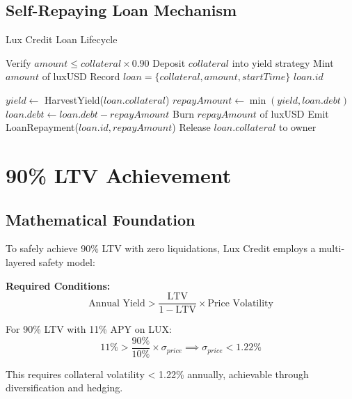 \documentclass[11pt,a4paper]{article}
\begin{document}
\subsection{Self-Repaying Loan Mechanism}

\begin{algorithm}[H]
\caption{Lux Credit Loan Lifecycle}
\begin{algorithmic}[1]
    \State Verify $amount \leq collateral \times 0.90$ 
    \State Deposit $collateral$ into yield strategy
    \State Mint $amount$ of luxUSD
    \State Record $loan = \{collateral, amount, startTime\}$
    \State \Return $loan.id$
\EndFunction

        \State $yield \gets$ HarvestYield($loan.collateral$)
        \State $repayAmount \gets \min(yield, loan.debt)$
        \State $loan.debt \gets loan.debt - repayAmount$
        \State Burn $repayAmount$ of luxUSD
        \State Emit LoanRepayment($loan.id, repayAmount$)
    \EndWhile
    \State Release $loan.collateral$ to owner
\EndFunction
\end{algorithmic}
\end{algorithm}

\section{90\% LTV Achievement}

\subsection{Mathematical Foundation}

To safely achieve 90\% LTV with zero liquidations, Lux Credit employs a multi-layered safety model:

\textbf{Required Conditions:}
\begin{equation}
\text{Annual Yield} > \frac{\text{LTV}}{1 - \text{LTV}} \times \text{Price Volatility}
\end{equation}

For 90\% LTV with 11\% APY on LUX:
\begin{equation}
11\% > \frac{90\%}{10\%} \times \sigma_{price} \implies \sigma_{price} < 1.22\%
\end{equation}

This requires collateral volatility < 1.22\% annually, achievable through diversification and hedging.
\end{document}
